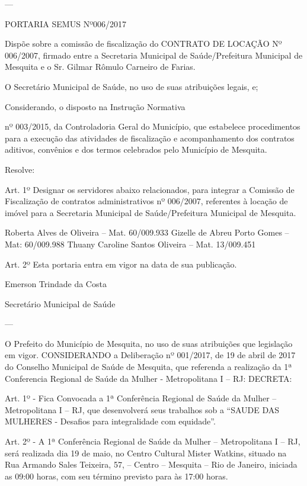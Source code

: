 \documentclass{doliberto}
\begin{document}
---

PORTARIA SEMUS Nº006/2017 
 

Dispõe sobre a comissão de fiscalização do 
CONTRATO DE LOCAÇÃO Nº 006/2007, firmado entre a 
Secretaria Municipal de Saúde/Prefeitura Municipal de 
Mesquita e o Sr. Gilmar Rômulo Carneiro de Farias. 
 

O  Secretário  Municipal  de  Saúde,  no  uso  de  suas 
atribuições legais, e; 
 
 
Considerando, o disposto na Instrução Normativa 
        
nº  003/2015,  da  Controladoria  Geral  do  Município,  que 
estabelece procedimentos para a execução das atividades de 
fiscalização  e  acompanhamento  dos  contratos  aditivos, 
convênios  e  dos  termos  celebrados  pelo  Município  de 
Mesquita.  
 
 
Resolve:  
 
Art.  1º  Designar  os  servidores  abaixo  relacionados,  para 
integrar  a  Comissão  de  Fiscalização  de  contratos 
administrativos nº 006/2007, referentes à locação de imóvel 
para a Secretaria Municipal de Saúde/Prefeitura Municipal 
de Mesquita. 

 
Roberta Alves de Oliveira – Mat. 60/009.933 
Gizelle de Abreu Porto Gomes – Mat: 60/009.988 
Thuany Caroline Santos Oliveira – Mat. 13/009.451 
 
Art.  2º  Esta  portaria  entra  em  vigor  na  data  de  sua 
publicação. 
 
Emerson Trindade da Costa 

Secretário Municipal de Saúde 

---

O  Prefeito  do  Município  de  Mesquita,  no  uso  de  suas 
atribuições  que 
legislação  em  vigor. 
CONSIDERANDO a Deliberação nº 001/2017, de 19 de abril 
de 2017 do Conselho Municipal de Saúde de Mesquita, que 
referenda a realização da 1ª Conferencia Regional de Saúde 
da Mulher - Metropolitana I – RJ: 
DECRETA:  
 
Art. 1º - Fica Convocada a 1ª Conferência Regional de Saúde 
da  Mulher  –  Metropolitana  I  –  RJ,  que  desenvolverá  seus 
trabalhos  sob  a 
  “SAUDE  DAS 
MULHERES - Desafios para integralidade com equidade”.  
 
Art.  2º  -  A  1ª  Conferência  Regional  de  Saúde  da  Mulher  – 
Metropolitana I – RJ, será realizada dia 19 de maio, no Centro 
Cultural  Mister  Watkins,  situado  na  Rua  Armando  Sales 
Teixeira, 57, – Centro – Mesquita – Rio de Janeiro, iniciada as 
09:00 horas, com seu término previsto para às 17:00 horas.  
 
\end{document}
